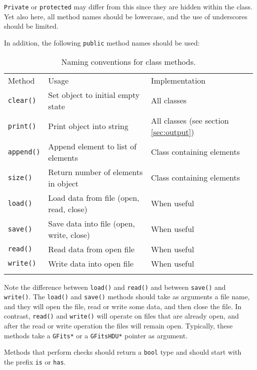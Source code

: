 \documentclass{article}[12pt,a4]
\begin{document}
{\tt Private} or {\tt protected} may differ from this since they are hidden within the class.
Yet also here, all method names should be lowercase, and the use of underscores
should be limited.
 
In addition, the following {\tt public} method names should be used:

\begin{table}[!h]
\caption{Naming conventions for class methods.
\label{tab:naming}}
\begin{center}
\begin{tabular}{lll}
\hline
\hline
\noalign{\smallskip}
Method & Usage & Implementation \\
\noalign{\smallskip}
\hline
\noalign{\smallskip}
{\tt clear()} & Set object to initial empty state & All classes \\
{\tt print()} & Print object into string & All classes (see section \ref{sec:output}) \\
{\tt append()} & Append element to list of elements & Class containing elements \\
{\tt size()} & Return number of elements in object & Class containing elements \\
{\tt load()} & Load data from file (open, read, close) & When useful \\
{\tt save()} & Save data into file (open, write, close) & When useful \\
{\tt read()} & Read data from open file & When useful \\
{\tt write()} & Write data into open file & When useful \\
\noalign{\smallskip}
\hline
\end{tabular}
\end{center}
\end{table}

Note the difference between {\tt load()} and {\tt read()} and between {\tt save()} and {\tt write()}.
The {\tt load()} and {\tt save()} methods should take as arguments a file name, and they
will open the file, read or write some data, and then close the file.
In contrast, {\tt read()} and {\tt write()} will operate on files that are already open, and after
the read or write operation the files will remain open.
Typically, these methods take a {\tt GFits*} or a {\tt GFitsHDU*} pointer as argument.

Methods that perform checks should return a {\tt bool} type and should start with the
prefix {\tt is} or {\tt has}.
\end{document}
